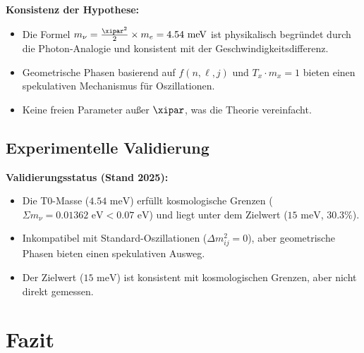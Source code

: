 	\begin{important}
		\textbf{Konsistenz der Hypothese:}
		\begin{itemize}
			\item Die Formel \(m_\nu = \frac{\xipar^2}{2} \times m_e = 4.54 \text{ meV}\) ist physikalisch begründet durch die Photon-Analogie und konsistent mit der Geschwindigkeitsdifferenz.
			\item Geometrische Phasen basierend auf \(f(n, \ell, j)\) und \(T_x \cdot m_x = 1\) bieten einen spekulativen Mechanismus für Oszillationen.
			\item Keine freien Parameter außer \(\xipar\), was die Theorie vereinfacht.
		\end{itemize}
	\end{important}
	
	\subsection{Experimentelle Validierung}
	
	\begin{experimental}
		\textbf{Validierungsstatus (Stand 2025):}
		\begin{itemize}
			\item Die T0-Masse (\(4.54 \text{ meV}\)) erfüllt kosmologische Grenzen (\(\Sigma m_\nu = 0.01362 \text{ eV} < 0.07 \text{ eV}\)) und liegt unter dem Zielwert (\(15 \text{ meV}\), \(30.3\%\)).
			\item Inkompatibel mit Standard-Oszillationen (\(\Delta m^2_{ij} = 0\)), aber geometrische Phasen bieten einen spekulativen Ausweg.
			\item Der Zielwert (\(15 \text{ meV}\)) ist konsistent mit kosmologischen Grenzen, aber nicht direkt gemessen.
		\end{itemize}
	\end{experimental}
	
	\section{Fazit}
	
